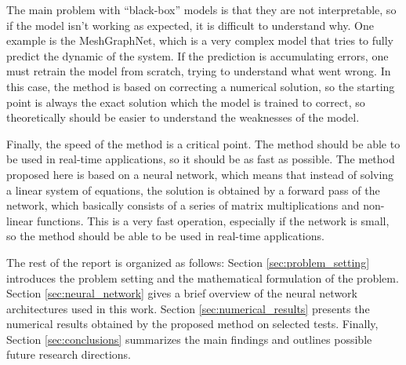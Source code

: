 The main problem with ``black-box'' models is that they are not interpretable, so if the model isn't working as expected, it is difficult to understand why. One example is the MeshGraphNet, which is a very complex model that tries to fully predict the dynamic of the system. If the prediction is accumulating errors, one must retrain the model from scratch, trying to understand what went wrong. In this case, the method is based on correcting a numerical solution, so the starting point is always the exact solution which the model is trained to correct, so theoretically should be easier to understand the weaknesses of the model.

Finally, the speed of the method is a critical point. The method should be able to be used in real-time applications, so it should be as fast as possible. The method proposed here is based on a neural network, which means that instead of solving a linear system of equations, the solution is obtained by a forward pass of the network, which basically consists of a series of matrix multiplications and non-linear functions. This is a very fast operation, especially if the network is small, so the method should be able to be used in real-time applications.

The rest of the report is organized as follows: Section \ref{sec:problem_setting} introduces the problem setting and the mathematical formulation of the problem. Section \ref{sec:neural_network} gives a brief overview of the neural network architectures used in this work. Section \ref{sec:numerical_results} presents the numerical results obtained by the proposed method on selected tests. Finally, Section \ref{sec:conclusions} summarizes the main findings and outlines possible future research directions.